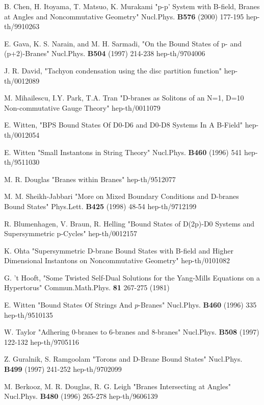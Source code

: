 \documentclass[a4paper,12pt]{article}
\begin{document}
\begin{thebibliography}{99}

B. Chen, H. Itoyama, T. Matsuo, K. Murakami "p-p' System with B-field, Branes at Angles and Noncommutative Geometry"  Nucl.Phys. \textbf{B576} (2000) 177-195 hep-th/9910263

E. Gava, K. S. Narain, and M. H. Sarmadi, "On the Bound States of p- and (p+2)-Branes" Nucl.Phys. \textbf{B504} (1997) 214-238 hep-th/9704006   

J. R. David, "Tachyon condensation using the disc partition function" hep-th/0012089

M. Mihailescu, I.Y. Park, T.A. Tran "D-branes as Solitons of an N=1, D=10 Non-commutative Gauge Theory" hep-th/0011079

E. Witten, "BPS Bound States Of D0-D6 and D0-D8 Systems In A B-Field" hep-th/0012054

E. Witten "Small Instantons in String Theory" Nucl.Phys. \textbf{B460} (1996) 541 hep-th/9511030

M. R. Douglas "Branes within Branes" hep-th/9512077

M. M. Sheikh-Jabbari "More on Mixed Boundary Conditions and D-branes Bound States" Phys.Lett. \textbf{B425} (1998) 48-54 hep-th/9712199

R. Blumenhagen, V. Braun, R. Helling "Bound States of D(2p)-D0 Systems and
Supersymmetric p-Cycles" hep-th/0012157

K. Ohta "Supersymmetric D-brane Bound States with B-field and Higher Dimensional Instantons on Noncommutative Geometry" hep-th/0101082

G. 't Hooft, "Some Twisted Self-Dual Solutions for the Yang-Mills Equations on a Hypertorus" Commun.Math.Phys. \textbf{81} 267-275 (1981)

E. Witten "Bound States Of Strings And $p$-Branes" Nucl.Phys. \textbf{B460} (1996) 335 hep-th/9510135

W. Taylor "Adhering 0-branes to 6-branes and 8-branes" Nucl.Phys. \textbf{B508} (1997) 122-132 hep-th/9705116

Z. Guralnik, S. Ramgoolam "Torons and D-Brane Bound States" Nucl.Phys. \textbf{B499} (1997) 241-252 hep-th/9702099

M. Berkooz, M. R. Douglas, R. G. Leigh "Branes Intersecting at Angles" Nucl.Phys. \textbf{B480} (1996) 265-278 hep-th/9606139


\end{thebibliography}
\end{document}
